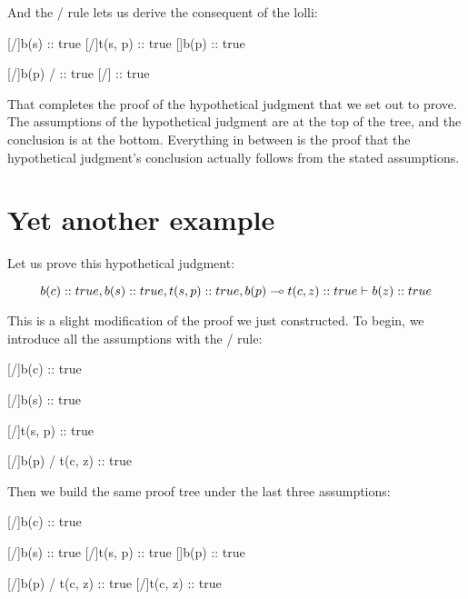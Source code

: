\documentclass[../../../main.tex]{subfiles}
\begin{document}
\noindent
And the \lolliElim/ rule lets us derive the consequent of the lolli:

\begin{prooftree*}
  \hypo{}
  [\startrule/]{b(s) :: true}
  \hypo{}
  [\startrule/]{t(s, p) :: true}
  []{b(p) :: true}
  
  \hypo{}
  [\startrule/]{b(p) \lolli/  :: true}  
  [\lolliElim/]{ :: true}
\end{prooftree*}

\noindent
That completes the proof of the hypothetical judgment that we set out to prove. The assumptions of the hypothetical judgment are at the top of the tree, and the conclusion is at the bottom. Everything in between is the proof that the hypothetical judgment's conclusion actually follows from the stated assumptions.


\section{Yet another example}

Let us prove this hypothetical judgment:

\begin{equation*}
  b(c) :: true, b(s) :: true, t(s, p) :: true, b(p) \lolli/ t(c, z) :: true \ndturnstile/ b(z) :: true
\end{equation*}

\noindent
This is a slight modification of the proof we just constructed. To begin, we introduce all the assumptions with the \startrule/ rule:

\begin{prooftree*}
  \hypo{}
  [\startrule/]{b(c) :: true}

  \hypo{}
  [\startrule/]{b(s) :: true}

  \hypo{}
  [\startrule/]{t(s, p) :: true}
  
  \hypo{}
  [\startrule/]{b(p) \lolli/ t(c, z) :: true}  

\end{prooftree*}

\noindent
Then we build the same proof tree under the last three assumptions:

\begin{prooftree*}
  \hypo{}
  [\startrule/]{b(c) :: true}

  \hypo{}
  [\startrule/]{b(s) :: true}
  \hypo{}
  [\startrule/]{t(s, p) :: true}
  []{b(p) :: true}
  
  \hypo{}
  [\startrule/]{b(p) \lolli/ t(c, z) :: true}  
  [\lolliElim/]{t(c, z) :: true}
  
\end{prooftree*}
\end{document}
